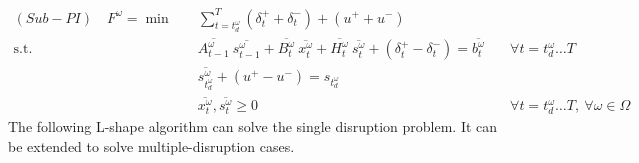 \documentclass[11pt]{article}
\newcommand{\noi}{\noindent}
\begin{document}
	\begin{align}
		(Sub-PI) \quad F^\omega = \min \quad & \sum_{t = t_d^\omega}^T (\delta_t^+ + \delta_t^-) + (u^+ + u^-) & \\
		\text{s.t.} \quad & \overline{A_{t-1}^\omega} \  \overline{s_{t-1}^\omega} + \overline{B_{t}^\omega}\ \overline{x_{t}^\omega} + \overline{H_{t}^\omega}\ \overline{s_{t}^\omega} + (\delta_t^+ - \delta_t^-) = \overline{b_t^\omega} \quad & \forall t = t_d^\omega \dots T \\
		& \overline{s_{t_d^\omega}^\omega} + (u^+ - u^-) = s_{t_d^\omega} &\\
		& \overline{x_t^\omega}, \overline{s_t^\omega} \geq 0 \quad & \forall t = t_d^\omega \dots T,\ \forall \omega \in \Omega
	\end{align}
	\noi The following L-shape algorithm can solve the single disruption problem. It can be extended to solve multiple-disruption cases.
	
\end{document}
